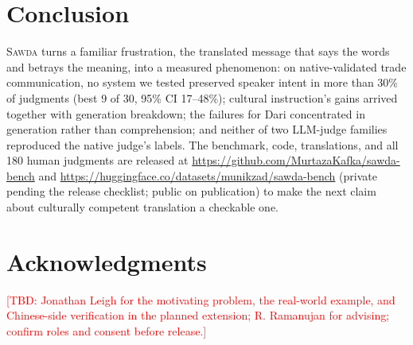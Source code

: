 \documentclass[11pt]{article}
\newcommand{\tbd}[1]{\textcolor{red}{[TBD: #1]}}
\newcommand{\bench}{\textsc{Sawda}}
\begin{document}
\section{Conclusion}
\bench{} turns a familiar frustration, the translated message that says the words and betrays the meaning, into a measured phenomenon: on native-validated trade communication, no system we tested preserved speaker intent in more than 30\% of judgments (best 9 of 30, 95\% CI 17--48\%); cultural instruction's gains arrived together with generation breakdown; the failures for Dari concentrated in generation rather than comprehension; and neither of two LLM-judge families reproduced the native judge's labels. The benchmark, code, translations, and all 180 human judgments are released at \url{https://github.com/MurtazaKafka/sawda-bench} and \url{https://huggingface.co/datasets/munikzad/sawda-bench} (private pending the release checklist; public on publication) to make the next claim about culturally competent translation a checkable one.

\section*{Acknowledgments}
\tbd{Jonathan Leigh for the motivating problem, the real-world example, and Chinese-side verification in the planned extension; R. Ramanujan for advising; confirm roles and consent before release.}



\end{document}
